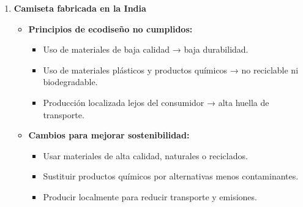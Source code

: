 


\begin{solution}
\begin{enumerate}[label=\alph*)]
    \item \textbf{Camiseta fabricada en la India}
    \begin{itemize}
        \item \textbf{Principios de ecodiseño no cumplidos:}
            \begin{itemize}
                \item Uso de materiales de baja calidad → baja durabilidad.
                \item Uso de materiales plásticos y productos químicos → no reciclable ni biodegradable.
                \item Producción localizada lejos del consumidor → alta huella de transporte.
            \end{itemize}
        \item \textbf{Cambios para mejorar sostenibilidad:}
            \begin{itemize}
                \item Usar materiales de alta calidad, naturales o reciclados.
                \item Sustituir productos químicos por alternativas menos contaminantes.
                \item Producir localmente para reducir transporte y emisiones.
            \end{itemize}
    \end{itemize}


\end{enumerate}
\end{solution}
